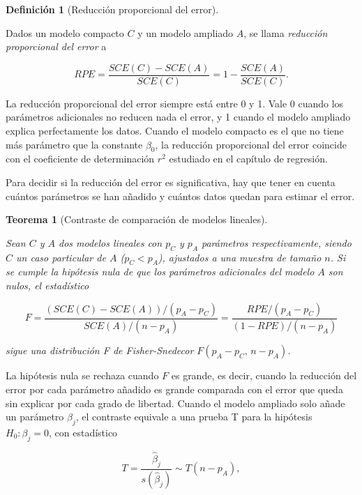 \documentclass[
  spanish,
  a4paper,
]{scrreport}
\theoremstyle{plain}
\newtheorem{theorem}{Teorema}[chapter]
\theoremstyle{definition}
\theoremstyle{definition}
\newtheorem{definition}{Definición}[chapter]
\theoremstyle{remark}
\begin{document}
\begin{definition}[Reducción proporcional del
error]\protect\hypertarget{def-reduccion-proporcional-error}{}\label{def-reduccion-proporcional-error}

Dados un modelo compacto \(C\) y un modelo ampliado \(A\), se llama
\emph{reducción proporcional del error} a

\[
RPE = \frac{SCE(C)-SCE(A)}{SCE(C)} = 1-\frac{SCE(A)}{SCE(C)}.
\]

\end{definition}

La reducción proporcional del error siempre está entre 0 y 1. Vale 0
cuando los parámetros adicionales no reducen nada el error, y 1 cuando
el modelo ampliado explica perfectamente los datos. Cuando el modelo
compacto es el que no tiene más parámetro que la constante \(\beta_0\),
la reducción proporcional del error coincide con el coeficiente de
determinación \(r^2\) estudiado en el capítulo de regresión.

Para decidir si la reducción del error es significativa, hay que tener
en cuenta cuántos parámetros se han añadido y cuántos datos quedan para
estimar el error.

\begin{theorem}[Contraste de comparación de modelos
lineales]\protect\hypertarget{thm-contraste-comparacion-modelos}{}\label{thm-contraste-comparacion-modelos}

Sean \(C\) y \(A\) dos modelos lineales con \(p_C\) y \(p_A\) parámetros
respectivamente, siendo \(C\) un caso particular de \(A\) (\(p_C<p_A\)),
ajustados a una muestra de tamaño \(n\). Si se cumple la hipótesis nula
de que los parámetros adicionales del modelo \(A\) son nulos, el
estadístico

\[
F = \frac{(SCE(C)-SCE(A))/(p_A-p_C)}{SCE(A)/(n-p_A)} = \frac{RPE/(p_A-p_C)}{(1-RPE)/(n-p_A)}
\]

sigue una distribución F de Fisher-Snedecor \(F(p_A-p_C,\, n-p_A)\).

\end{theorem}

La hipótesis nula se rechaza cuando \(F\) es grande, es decir, cuando la
reducción del error por cada parámetro añadido es grande comparada con
el error que queda sin explicar por cada grado de libertad. Cuando el
modelo ampliado solo añade un parámetro \(\beta_j\), el contraste
equivale a una prueba T para la hipótesis \(H_0: \beta_j=0\), con
estadístico

\[
T = \frac{\hat\beta_j}{s(\hat\beta_j)}\sim T(n-p_A),
\]
\end{document}

